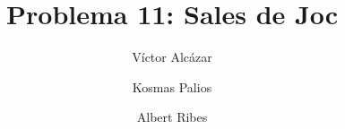 
\usepackage[utf8]{inputenc}
\usepackage{enumitem}

\title{Problema 11: Sales de Joc}
\author{
Víctor Alcázar
\and
Kosmas Palios
\and
Albert Ribes
}

\maketitle




